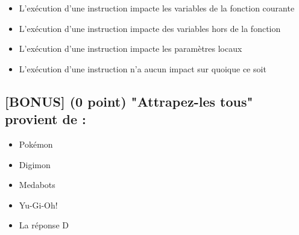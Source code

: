 \documentclass[11pt,a4paper]{article}
\begin{document}
\begin{itemize}
  \item[\CaseCoche] L'exécution d'une instruction impacte les variables de la fonction courante \\
  \item[\CaseCoche] L'exécution d'une instruction impacte des variables hors de la fonction \\
  \item[\CaseCoche] L'exécution d'une instruction impacte les paramètres locaux \\
  \item[\CaseCoche] L'exécution d'une instruction n'a aucun impact sur quoique ce soit \\
\end{itemize}


\bigskip


\subsection{[BONUS] (0 point) "Attrapez-les tous" provient de : }

\begin{itemize}
  \item[\CaseCoche] Pokémon \\
  \item[\CaseCoche] Digimon \\
  \item[\CaseCoche] Medabots \\
  \item[\CaseCoche] Yu-Gi-Oh! \\
  \item[\CaseCoche] La réponse D \\
\end{itemize}
\end{document}
